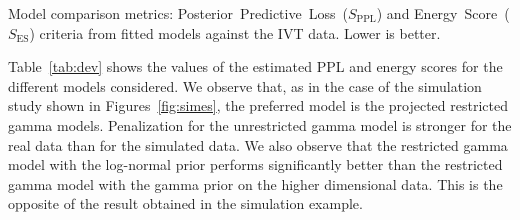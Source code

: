 \begin{table}[t]
  \centering
  \caption{Model comparison metrics: Posterior~Predictive~Loss~($S_{\text{PPL}}$) and 
    Energy~Score~($S_{\text{ES}}$) criteria from fitted models against the IVT data.  
    Lower is better. \label{tab:dev}}
  
\end{table}

Table~\ref{tab:dev} shows the values of the estimated PPL and energy scores for the different models considered. We observe that, as in the case of the simulation study shown in Figures~\ref{fig:simes}, the preferred model is the projected restricted 
  gamma models.  Penalization for the unrestricted gamma model is 
  stronger for the real data than for the simulated data. We also observe that
  the restricted gamma model with the log-normal prior performs significantly better 
  than the restricted gamma model with the gamma prior on the higher dimensional data. This is the opposite of the result obtained in the simulation example.

